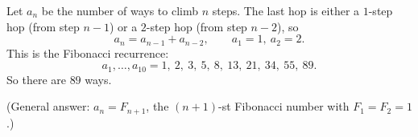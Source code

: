 Let $a_n$ be the number of ways to climb $n$ steps. The last hop is either a $1$-step hop (from step $n-1$) or a $2$-step hop (from step $n-2$), so
\[
a_n=a_{n-1}+a_{n-2},\qquad a_1=1,\ a_2=2 .
\]
This is the Fibonacci recurrence:
\[
a_1,\dots,a_{10}=1,\ 2,\ 3,\ 5,\ 8,\ 13,\ 21,\ 34,\ 55,\ 89 .
\]
So there are $\boxed{89}$ ways.

(General answer: $a_n=F_{n+1}$, the $(n+1)$-st Fibonacci number with $F_1=F_2=1$.)
